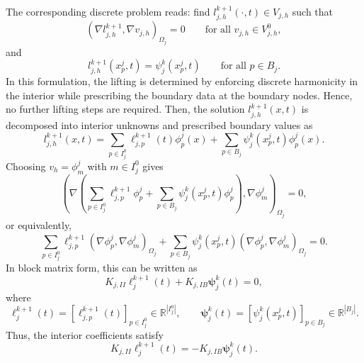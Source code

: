 \documentclass[a4paper, 11pt]{article}
\theoremstyle{remark}
\begin{document}
\begin{enumerate}[label = (\arabic*)]
\vspace{10pt}
\noindent The corresponding discrete problem reads: find $l_{j, h}^{k+1}(\cdot, t)\in V_{j, h}$ such that 
\begin{equation*}
    \left(\nabla l_{j, h}^{k+1}, \nabla v_{j, h}\right)_{\Omega_{j}} = 0 \qquad \text{for all } v_{j, h}\in V^{0}_{j, h},
\end{equation*}
and
\begin{equation*}
    l_{j, h}^{k+1}(x^{j}_{p}, t) = \psi_{j}^{k}(x^{j}_{p}, t) \qquad \text{for all } p\in B_{j}.
\end{equation*}
In this formulation, the lifting is determined by enforcing discrete harmonicity in the interior while prescribing the boundary data at the boundary nodes. Hence, no further lifting steps are required. Then, the solution $l_{j, h}^{k+1}(x, t)$ is decomposed into interior unknowns and prescribed boundary values as
\begin{equation*}
    l_{j, h}^{k+1}(x, t) = \sum_{p\in I^{0}_{j}} \ell_{j, p}^{k+1}(t)\phi^{j}_{p}(x) + \sum_{p\in B_{j}}\psi_{j}^{k}(x^{j}_{p}, t)\phi_{p}^{j}(x).
\end{equation*}
Choosing $v_h=\phi_m^j$ with $m\in I_j^0$ gives
\begin{equation*}
    \left(\nabla\left( \sum_{p\in I^{0}_{j}} \ell_{j, p}^{k+1}\phi^{j}_{p} + \sum_{p\in B_{j}}\psi_{j}^{k}(x^{j}_{p}, t)\phi^{j}_{p}\right), \nabla \phi^{j}_{m}\right)_{\Omega_{j}} = 0,
\end{equation*}
or equivalently,
\begin{equation*}
    \sum_{p\in I^{0}_{j}} \ell_{j, p}^{k+1}\left(\nabla\phi^{j}_{p}, \nabla\phi^{j}_{m}\right)_{\Omega_{j}} + \sum_{p\in B_{j}}\psi_{j}^{k}(x^{j}_{p}, t)\left(\nabla\phi^{j}_{p}, \nabla\phi^{j}_{m}\right)_{\Omega_{j}} = 0.
\end{equation*}
In block matrix form, this can be written as
\begin{equation*}
    K_{j, II}\boldsymbol{\ell}_{j}^{k+1}(t) + K_{j, IB}\boldsymbol{\psi}_{j}^{k}(t) = 0,
\end{equation*}
where
\begin{equation*}
    \boldsymbol{\ell}_{j}^{k+1}(t) = [\ell_{j, p}^{k+1}(t)]_{p\in I^{0}_{j}}\in\mathbb{R}^{|I^{0}_{j}|}, \qquad \boldsymbol{\psi}_{j}^{k}(t) = [\psi_{j}^{k}(x^{j}_{p}, t)]_{p\in B_{j}}\in\mathbb{R}^{|B_{j}|}.
\end{equation*}
Thus, the interior coefficients satisfy
\begin{equation*}
    K_{j, II}\boldsymbol{\ell}_{j}^{k+1}(t) = - K_{j, IB}\boldsymbol{\psi}_{j}^{k}(t).

\end{equation*}
\end{enumerate}
\end{document}
